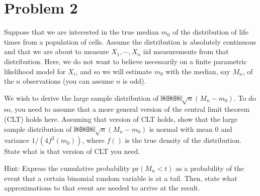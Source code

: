 \documentclass[letterpaper, 12pt]{article}
\newcommand{\pr}{\text{pr}}
\begin{document}
\section*{Problem 2} 
Suppose that we are interested in the true median $m_0$ of the distribution of life times from a population of cells.
Assume the distribution is absolutely continuous and that we are about to measure $X_1,\cdots,X_n$ iid measurements from that distribution. 
Here, we do not want to believe necessarily on a finite parametric likelihood model for $X_i$, and so we will estimate $m_0$ with the median, say $M_n$, of the $n$ observations (you can assume $n$ is odd). 

We wish to derive the large sample distribution of
￼￼￼$\sqrt{n}(M_n - m_0)$. 
To do so, you need to assume that a more
general version of the central limit theorem (CLT) holds here. 
Assuming that version of CLT holds, show that the large sample distribution of ￼￼￼$\sqrt{n}(M_n - m_0)$ is normal with mean $0$ and variance $1/(4f^2(m_0))$, where $f()$ is the true density of the distribution. 
State what is that version of CLT you need.

Hint: Express the cumulative probability $\pr(M_n < t)$ as a probability of the event that a certain binomial random variable is at a tail. Then, state what approximations to that event are needed to arrive at the result.
\end{document}
